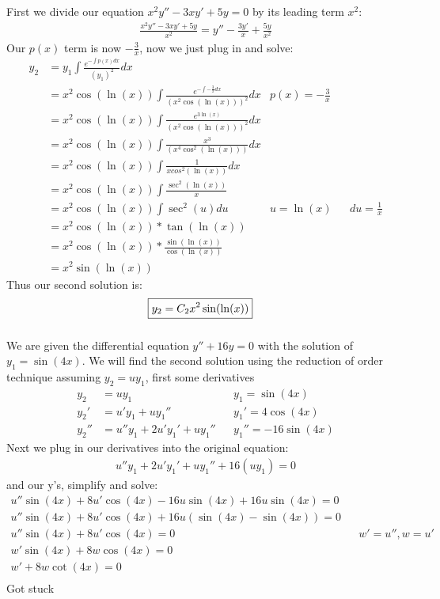 \documentclass{article}
\begin{document}
First we divide our equation $x^2y'' - 3xy' + 5y = 0$ by its leading term $x^2$:  
\setcounter{equation}{0}
\begin{align*}
    \frac{x^2y'' - 3xy' + 5y}{x^2} = y'' - \frac{3y'}{x} + \frac{5y}{x^2}
\end{align*}
Our $p (x) $ term is now $-\frac{3}{x}$, now we just plug in and solve:
\begin{align}
    y_2 &= y_1\int \frac{e^{- \int p(x)dx}}{(y_1)^2}dx \\ 
    &  = x^2 \cos(\ln(x)) \int \frac{e^{- \int -\frac{3}{x}dx}}{(x^2 \cos(\ln(x)))^2}dx & p(x) = - \frac{3}{x}  \\
    & = x^2 \cos(\ln(x)) \int \frac{e^{3\ln(x)}}{(x^2 \cos(\ln(x)))^2}dx \\
    & = x^2 \cos(\ln(x)) \int \frac{x^3}{(x^4 \cos^2(\ln(x)))}dx \\
    & = x^2 \cos(\ln(x)) \int \frac{1}{xcos^2(\ln(x))}dx \\
    & = x^2 \cos(\ln(x)) \int \frac{\sec^2(\ln(x))}{x} \\
    & = x^2 \cos(\ln(x)) \int {\sec^2(u)}du & u = \ln(x) && du = \frac{1}{x}\\
    & = x^2 \cos(\ln(x)) * \tan(\ln(x))\\
    & = x^2 \cos(\ln(x)) * \frac{\sin(\ln(x))}{\cos(\ln(x))} \\
    & = x^2 \sin(\ln(x))
\end{align}
Thus our second solution is:
\begin{align*}
    \Aboxed{y_2 = C_2x^2 \sin(\ln(x))}
\end{align*}
\subsubsection{} \setcounter{equation}{0}
We are given the differential equation $y'' + 16y = 0$ with the solution of $y_1 = \sin(4x)$. We will find the second solution using the reduction of order technique assuming $y_2 = uy_1$, first some derivatives
\begin{align*}
    y_2 &= uy_1 && y_1 = \sin(4x)\\
    y_2' &= u'y_1 + uy_1'' && y_1' = 4\cos(4x) \\
    y_2'' &= u''y_1 + 2u'y_1' + uy_1''&& y_1'' = -16\sin(4x)
\end{align*}
Next we plug in our derivatives into the original equation:
\begin{align}
    u''y_1 + 2u'y_1' + uy_1'' + 16(uy_1) = 0
\end{align}
and our y's, simplify and solve:
\begin{align}
     u''\sin(4x) + 8u'\cos(4x)-16u\sin(4x) + 16u\sin(4x) = 0\\
     u''\sin(4x) + 8u'\cos(4x)+16u(\sin(4x) - \sin(4x)) = 0\\
     u''\sin(4x) + 8u'\cos(4x) = 0 && w' = u'', w = u'\\
     w'\sin(4x) + 8w\cos(4x) = 0 \\
     w' + 8w\cot(4x) = 0 \\
\end{align}
Got stuck
\end{document}
